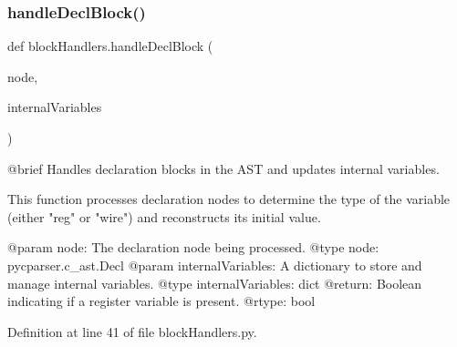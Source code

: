 \subsubsection{\texorpdfstring{handle\+Decl\+Block()}{handleDeclBlock()}}
{\footnotesize\ttfamily def block\+Handlers.\+handle\+Decl\+Block (\begin{DoxyParamCaption}\item[{}]{node,  }\item[{}]{internal\+Variables }\end{DoxyParamCaption})}

\begin{DoxyVerb}@brief Handles declaration blocks in the AST and updates internal variables.

This function processes declaration nodes to determine the type of the variable (either "reg" or "wire") and reconstructs its initial value.

@param node: The declaration node being processed.
@type node: pycparser.c_ast.Decl
@param internalVariables: A dictionary to store and manage internal variables.
@type internalVariables: dict
@return: Boolean indicating if a register variable is present.
@rtype: bool
\end{DoxyVerb}
 

Definition at line 41 of file block\+Handlers.\+py.



